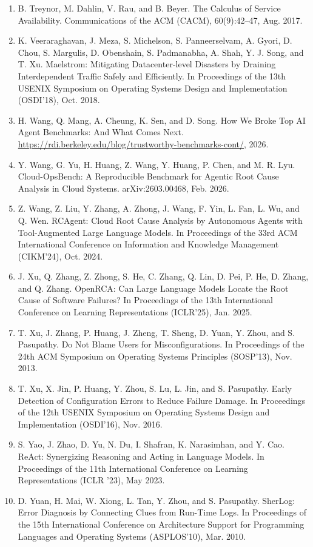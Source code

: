 \documentclass[11pt,UTF8,fontset=fandol]{ctexart}
\begin{document}
\begin{enumerate}[leftmargin=2.2em,labelsep=0.4em,itemsep=0.15em]
\item B. Treynor, M. Dahlin, V. Rau, and B. Beyer. The Calculus of Service Availability. Communications of the ACM (CACM), 60(9):42--47, Aug. 2017.
\item K. Veeraraghavan, J. Meza, S. Michelson, S. Panneerselvam, A. Gyori, D. Chou, S. Margulis, D. Obenshain, S. Padmanabha, A. Shah, Y. J. Song, and T. Xu. Maelstrom: Mitigating Datacenter-level Disasters by Draining Interdependent Traffic Safely and Efficiently. In Proceedings of the 13th USENIX Symposium on Operating Systems Design and Implementation (OSDI'18), Oct. 2018.
\item H. Wang, Q. Mang, A. Cheung, K. Sen, and D. Song. How We Broke Top AI Agent Benchmarks: And What Comes Next. \url{https://rdi.berkeley.edu/blog/trustworthy-benchmarks-cont/}, 2026.
\item Y. Wang, G. Yu, H. Huang, Z. Wang, Y. Huang, P. Chen, and M. R. Lyu. Cloud-OpsBench: A Reproducible Benchmark for Agentic Root Cause Analysis in Cloud Systems. arXiv:2603.00468, Feb. 2026.
\item Z. Wang, Z. Liu, Y. Zhang, A. Zhong, J. Wang, F. Yin, L. Fan, L. Wu, and Q. Wen. RCAgent: Cloud Root Cause Analysis by Autonomous Agents with Tool-Augmented Large Language Models. In Proceedings of the 33rd ACM International Conference on Information and Knowledge Management (CIKM'24), Oct. 2024.
\item J. Xu, Q. Zhang, Z. Zhong, S. He, C. Zhang, Q. Lin, D. Pei, P. He, D. Zhang, and Q. Zhang. OpenRCA: Can Large Language Models Locate the Root Cause of Software Failures? In Proceedings of the 13th International Conference on Learning Representations (ICLR'25), Jan. 2025.
\item T. Xu, J. Zhang, P. Huang, J. Zheng, T. Sheng, D. Yuan, Y. Zhou, and S. Pasupathy. Do Not Blame Users for Misconfigurations. In Proceedings of the 24th ACM Symposium on Operating Systems Principles (SOSP'13), Nov. 2013.
\item T. Xu, X. Jin, P. Huang, Y. Zhou, S. Lu, L. Jin, and S. Pasupathy. Early Detection of Configuration Errors to Reduce Failure Damage. In Proceedings of the 12th USENIX Symposium on Operating Systems Design and Implementation (OSDI'16), Nov. 2016.
\item S. Yao, J. Zhao, D. Yu, N. Du, I. Shafran, K. Narasimhan, and Y. Cao. ReAct: Synergizing Reasoning and Acting in Language Models. In Proceedings of the 11th International Conference on Learning Representations (ICLR '23), May 2023.
\item D. Yuan, H. Mai, W. Xiong, L. Tan, Y. Zhou, and S. Pasupathy. SherLog: Error Diagnosis by Connecting Clues from Run-Time Logs. In Proceedings of the 15th International Conference on Architecture Support for Programming Languages and Operating Systems (ASPLOS'10), Mar. 2010.

\end{enumerate}
\end{document}
